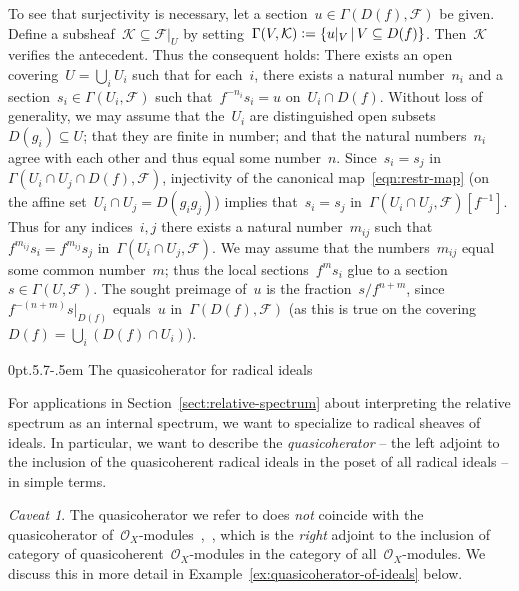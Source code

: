 \documentclass[10pt,reqno,a4paper]{amsbook}
\makeatletter
\theoremstyle{definition}
\theoremstyle{plain}
\theoremstyle{remark}
\newtheorem{caveat}[defn]{Caveat}
\newcommand{\F}{\mathcal{F}}
\renewcommand{\O}{\mathcal{O}}
\newcommand{\K}{\mathcal{K}}
\newcommand{\?}{\,{:}\,}
\renewcommand{\_}{\mathpunct{.}\,}
\newcommand{\stacksproject}[1]{\cite[{\href{https://stacks.math.columbia.edu/tag/#1}{Tag~#1}}]{stacks-project}}
\newcommand{\defeq}{\vcentcolon=}
\renewenvironment{proof}[1][\proofname]{\par
  \pushQED{\qed}%
  \normalfont \topsep6\p@\@plus6\p@\relax
  \trivlist
  \item[\hskip\labelsep
        \itshape
    #1\@addpunct{.}]\ignorespaces
}{%
  \popQED\endtrivlist\@endpefalse
}
\def\subsection{\@startsection{subsection}{2}%
  {0pt}{.5\linespacing\@plus.7\linespacing}{-.5em}%
  {\normalfont\bfseries}}
\makeatother
\begin{document}
\begin{proof}[Proof of Theorem~\ref{thm:qcoh-sheafchar}]
To see that surjectivity is necessary, let a section~$u \in \Gamma(D(f),\F)$ be
given. Define a subsheaf~$\K \subseteq \F|_U$ by setting~$\Gamma(V,\K) \defeq \{
u|_V \,|\, V \subseteq D(f) \}$. Then~$\K$ verifies the antecedent. Thus the
consequent holds: There exists an open covering~$U = \bigcup_i U_i$ such that
for each~$i$, there exists a natural number~$n_i$ and a section~$s_i \in
\Gamma(U_i,\F)$ such that~$f^{-n_i} s_i = u$ on~$U_i \cap D(f)$. Without loss of
generality, we may assume that the~$U_i$ are distinguished open subsets~$D(g_i)
\subseteq U$; that they are finite in number; and that the natural
numbers~$n_i$ agree with each other and thus equal some number~$n$. Since~$s_i
= s_j$ in~$\Gamma(U_i \cap U_j \cap D(f), \F)$, injectivity of the canonical
map~\eqref{eqn:restr-map} (on the affine set~$U_i \cap U_j = D(g_i g_j)$)
implies that~$s_i = s_j$ in~$\Gamma(U_i \cap U_j, \F)[f^{-1}]$. Thus for
any indices~$i,j$ there exists a natural number~$m_{ij}$ such that~$f^{m_{ij}} s_i =
f^{m_{ij}} s_j$ in~$\Gamma(U_i \cap U_j, \F)$. We may assume that the
numbers~$m_{ij}$ equal some common number~$m$; thus the local sections~$f^m s_i$
glue to a section~$s \in \Gamma(U,\F)$. The sought preimage of~$u$ is the
fraction~$s/f^{n+m}$, since~$f^{-(n+m)} s|_{D(f)}$ equals~$u$
in~$\Gamma(D(f),\F)$ (as this is true on the covering~$D(f) = \bigcup_i (D(f)
\cap U_i)$).
\end{proof}


\subsection{The quasicoherator for radical ideals}

For applications in Section~\ref{sect:relative-spectrum} about interpreting the
relative spectrum as an internal spectrum, we want to specialize to radical
sheaves of ideals. In particular, we want to describe the \emph{quasicoherator} --
the left adjoint to the inclusion of the quasicoherent radical ideals in the
poset of all radical ideals -- in simple terms.

\begin{caveat}The quasicoherator we refer to does \emph{not} coincide with the
quasicoherator
of~$\O_X$-modules~\stacksproject{077P},~\cite{thomason-trobaugh}, which is the
\emph{right} adjoint to the inclusion of category of
quasicoherent~$\O_X$-modules in the category of all~$\O_X$-modules. We discuss
this in more detail in Example~\ref{ex:quasicoherator-of-ideals} below.
\end{caveat}
\end{document}
